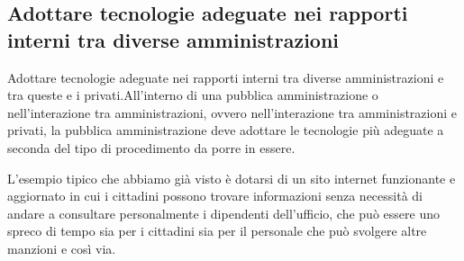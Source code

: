 \subsection{Adottare tecnologie adeguate nei rapporti interni tra diverse amministrazioni}

Adottare tecnologie adeguate nei rapporti interni tra diverse amministrazioni e tra queste e i privati.All'interno di una pubblica amministrazione o nell'interazione tra amministrazioni, ovvero nell'interazione tra amministrazioni e privati, la pubblica amministrazione deve adottare le tecnologie più adeguate  a seconda del tipo di procedimento da porre in essere. 

L'esempio tipico che abbiamo già visto è dotarsi di un sito internet funzionante e aggiornato in cui i cittadini possono trovare informazioni senza necessità di andare a consultare personalmente i dipendenti dell'ufficio, che può essere uno spreco di tempo sia per i cittadini sia per il personale che può svolgere altre manzioni e così via. 

